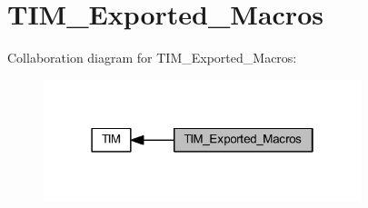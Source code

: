 \hypertarget{group___t_i_m___exported___macros}{}\section{T\+I\+M\+\_\+\+Exported\+\_\+\+Macros}
\label{group___t_i_m___exported___macros}
Collaboration diagram for T\+I\+M\+\_\+\+Exported\+\_\+\+Macros\+:
\nopagebreak
\begin{figure}[H]
\begin{center}
\leavevmode
\includegraphics[width=262pt]{group___t_i_m___exported___macros}
\end{center}
\end{figure}
